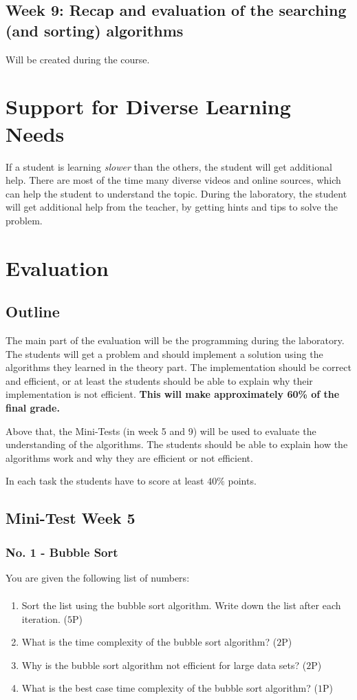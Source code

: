 \documentclass[10pt, oneside]{article}
\theoremstyle{remark}
\begin{document}
\subsection{Week 9: Recap and evaluation of the searching (and sorting) algorithms}
Will be created during the course.

\section{Support for Diverse Learning Needs}
If a student is learning \textit{slower} than the others, the student will get additional help. There are most of the time many diverse videos and online sources, which can help the student to understand the topic. During the laboratory, the student will get additional help from the teacher, by getting hints and tips to solve the problem.

\section{Evaluation}
\subsection{Outline}
The main part of the evaluation will be the programming during the laboratory. The students will get a problem and should implement a solution using the algorithms they learned in the theory part. The implementation should be correct and efficient, or at least the students should be able to explain why their implementation is not efficient. \textbf{This will make approximately 60\% of the final grade.}

Above that, the Mini-Tests (in week 5 and 9) will be used to evaluate the understanding of the algorithms. The students should be able to explain how the algorithms work and why they are efficient or not efficient. 

In each task the students have to score at least $40\%$ points.

\subsection{Mini-Test Week 5}
\subsubsection{No. 1 - Bubble Sort}
You are given the following list of numbers: 
\begin{align*}
  [5, 3, 8, 2, 1, 4, 7, 6]
\end{align*}
\begin{enumerate}
  \item Sort the list using the bubble sort algorithm. Write down the list after each iteration. ($5$P)
  \item What is the time complexity of the bubble sort algorithm? ($2$P)
  \item Why is the bubble sort algorithm not efficient for large data sets? ($2$P)
  \item What is the best case time complexity of the bubble sort algorithm? ($1$P)
\end{enumerate}
\end{document}
